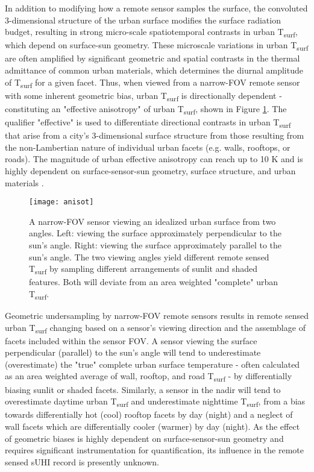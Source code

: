 \begin{bibunit}
In addition to modifying how a remote sensor samples the surface, the convoluted 3-dimensional structure of the urban surface modifies the surface radiation budget, resulting in strong micro-scale spatiotemporal contrasts in urban T\textsubscript{surf}, which depend on surface-sun geometry. These microscale variations in urban T\textsubscript{surf} are often amplified by significant geometric and spatial contrasts in the thermal admittance of common urban materials, which determines the diurnal amplitude of T\textsubscript{surf} for a given facet. Thus, when viewed from a narrow-FOV remote sensor with some inherent geometric bias, urban T\textsubscript{surf} is directionally dependent - constituting an "effective anisotropy" of urban T\textsubscript{surf}, shown in Figure \ref{anisot}. The qualifier "effective" is used to differentiate directional contrasts in urban T\textsubscript{surf} that arise from a city's 3-dimensional surface structure from those resulting from the non-Lambertian nature of individual urban facets (e.g. walls, rooftops, or roads). The magnitude of urban effective anisotropy can reach up to 10 \si{\kelvin} and is highly dependent on surface-sensor-sun geometry, surface structure, and urban materials \citep{Krayenhoff2016, Voogt1997}. 

\begin{figure}[H]
	\centering
	\texttt{[image: anisot]}
	\caption{A narrow-FOV sensor viewing an idealized urban surface from two angles. Left: viewing the surface approximately perpendicular to the sun's angle. Right: viewing the surface approximately parallel to the sun's angle. The two viewing angles yield different remote sensed T\textsubscript{surf} by sampling different arrangements of sunlit and shaded features. Both will deviate from an area weighted "complete" urban T\textsubscript{surf}.}
	\label{anisot}
\end{figure}

Geometric undersampling by narrow-FOV remote sensors results in remote sensed urban T\textsubscript{surf} changing based on a sensor's viewing direction and the assemblage of facets included within the sensor FOV. A sensor viewing the surface perpendicular (parallel) to the sun's angle will tend to underestimate (overestimate) the "true" complete urban surface temperature - often calculated as an area weighted average of wall, rooftop, and road T\textsubscript{surf} - by differentially biasing sunlit or shaded facets. Similarly, a sensor in the nadir will tend to overestimate daytime urban T\textsubscript{surf} and underestimate nighttime T\textsubscript{surf}, from a bias towards differentially hot (cool) rooftop facets by day (night) and a neglect of wall facets which are differentially cooler (warmer) by day (night). As the effect of geometric biases is highly dependent on surface-sensor-sun geometry and requires significant instrumentation for quantification, its influence in the remote sensed sUHI record is presently unknown.


\end{bibunit}
